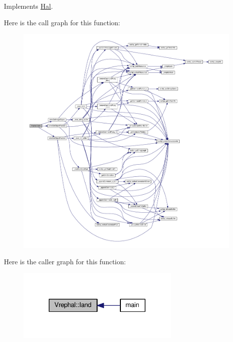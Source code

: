 Implements \hyperlink{class_hal_a8376a2668ed62e4d4d70f7b6336e84c4}{Hal}.



Here is the call graph for this function\+:
\nopagebreak
\begin{figure}[H]
\begin{center}
\leavevmode
\includegraphics[width=350pt]{class_vrephal_ab3475a8fa59a6b22fe8624194339b346_cgraph}
\end{center}
\end{figure}




Here is the caller graph for this function\+:
\nopagebreak
\begin{figure}[H]
\begin{center}
\leavevmode
\includegraphics[width=228pt]{class_vrephal_ab3475a8fa59a6b22fe8624194339b346_icgraph}
\end{center}
\end{figure}


